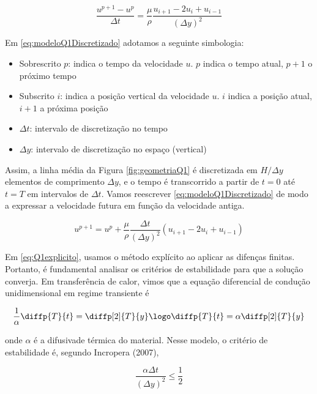 \begin{equation}\label{eq:modeloQ1Discretizado}
    \frac{u^{p+1} - u^p}{\Delta t} = \frac{\mu}{\rho} \frac{u_{i+1} - 2u_i + u_{i-1}}{\left(\Delta y\right)^2}
\end{equation}

Em \eqref{eq:modeloQ1Discretizado} adotamos a seguinte simbologia:

\begin{itemize}
    \item Sobrescrito $p$: indica o tempo da velocidade $u$. $p$ indica o tempo atual, $p + 1$ o próximo tempo
    \item Subscrito $i$: indica a posição vertical da velocidade $u$. $i$ indica a posição atual, $i + 1$ a próxima posição
    \item $\Delta t$: intervalo de discretização no tempo
    \item $\Delta y$: intervalo de discretização no espaço (vertical)
\end{itemize}

Assim, a linha média da Figura \ref*{fig:geometriaQ1} é discretizada em $H / \Delta y$ elementos de
comprimento $ \Delta y$, e o tempo é transcorrido a partir de $t = 0$ até $t = T$ em intervalos de
$ \Delta t$. Vamos reescrever \eqref{eq:modeloQ1Discretizado} de modo a expressar a
velocidade futura em função da velocidade antiga.

\begin{equation}\label{eq:Q1explicito}
    u^{p+1} = u^p + \frac{\mu}{\rho} \frac{\Delta t}{\left(\Delta y\right)^2} \left(u_{i+1} - 2u_i + u_{i-1}\right)
\end{equation}

Em \eqref{eq:Q1explicito}, usamos o método explícito ao aplicar as difenças finitas. Portanto,
é fundamental analisar os critérios de estabilidade para que a solução converja. Em transferência
de calor, vimos que a equação diferencial de condução unidimensional em regime transiente é

\begin{equation}\label{eq:transCalTransiente}
    \frac{1}{\alpha} \diffp{T}{t} = \diffp[2]{T}{y} \logo \diffp{T}{t} = \alpha \diffp[2]{T}{y}
\end{equation}

\noindent onde $\alpha$ é a difusivade térmica do material. Nesse modelo, o critério de estabilidade
é, segundo Incropera (2007),

\begin{equation}\label{eq:transCalestabilidade}
    \frac{\alpha \Delta t}{\left(\Delta y\right)^2} \leq \frac{1}{2}
\end{equation}

